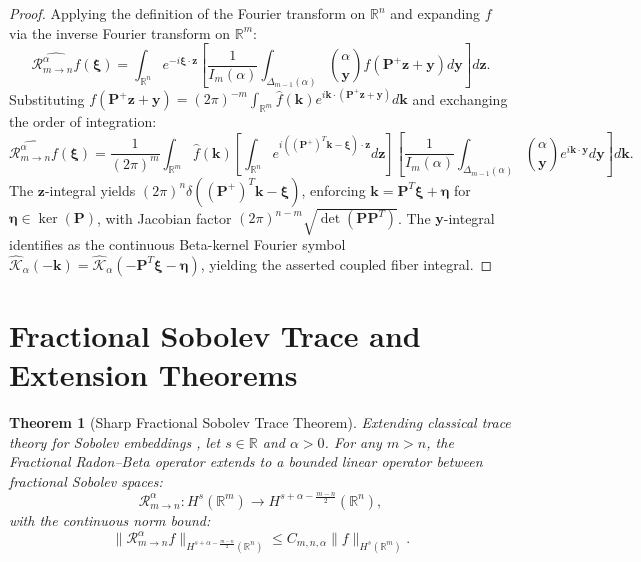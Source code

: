 \documentclass[11pt,a4paper]{article}
\theoremstyle{plain}
\newtheorem{theorem}{Theorem}[section]
\theoremstyle{definition}
\theoremstyle{remark}
\numberwithin{equation}{section}
\begin{document}
\begin{proof}
Applying the definition of the Fourier transform on $\mathbb{R}^n$ and expanding $f$ via the inverse Fourier transform on $\mathbb{R}^m$:
\begin{equation}
\widehat{\mathcal{R}_{m \to n}^\alpha f}(\boldsymbol{\xi}) = \int_{\mathbb{R}^n} e^{-i\boldsymbol{\xi}\cdot\mathbf{z}} \left[ \frac{1}{I_m(\alpha)}\int_{\Delta_{m-1}(\alpha)} \binom{\alpha}{\mathbf{y}} f(\mathbf{P}^+ \mathbf{z} + \mathbf{y}) d\mathbf{y} \right] d\mathbf{z}.
\end{equation}
Substituting $f(\mathbf{P}^+\mathbf{z} + \mathbf{y}) = (2\pi)^{-m}\int_{\mathbb{R}^m} \widehat{f}(\mathbf{k}) e^{i\mathbf{k}\cdot(\mathbf{P}^+\mathbf{z} + \mathbf{y})} d\mathbf{k}$ and exchanging the order of integration:
\begin{equation}
\widehat{\mathcal{R}_{m \to n}^\alpha f}(\boldsymbol{\xi}) = \frac{1}{(2\pi)^m}\int_{\mathbb{R}^m} \widehat{f}(\mathbf{k}) \left[\int_{\mathbb{R}^n} e^{i((\mathbf{P}^+)^T\mathbf{k} - \boldsymbol{\xi})\cdot\mathbf{z}} d\mathbf{z}\right] \left[\frac{1}{I_m(\alpha)}\int_{\Delta_{m-1}(\alpha)} \binom{\alpha}{\mathbf{y}} e^{i\mathbf{k}\cdot\mathbf{y}} d\mathbf{y}\right] d\mathbf{k}.
\end{equation}
The $\mathbf{z}$-integral yields $(2\pi)^n \delta((\mathbf{P}^+)^T\mathbf{k} - \boldsymbol{\xi})$, enforcing $\mathbf{k} = \mathbf{P}^T\boldsymbol{\xi} + \boldsymbol{\eta}$ for $\boldsymbol{\eta} \in \operatorname{ker}(\mathbf{P})$, with Jacobian factor $(2\pi)^{n-m}\sqrt{\det(\mathbf{P}\mathbf{P}^T)}$. The $\mathbf{y}$-integral identifies as the continuous Beta-kernel Fourier symbol $\widehat{\mathcal{K}}_\alpha(-\mathbf{k}) = \widehat{\mathcal{K}}_\alpha(-\mathbf{P}^T\boldsymbol{\xi} - \boldsymbol{\eta})$, yielding the asserted coupled fiber integral.
\end{proof}

\section{Fractional Sobolev Trace and Extension Theorems}

\begin{theorem}[Sharp Fractional Sobolev Trace Theorem]
\label{thm:sobolev_trace}
Extending classical trace theory for Sobolev embeddings \cite{adams2003}, let $s \in \mathbb{R}$ and $\alpha > 0$. For any $m > n$, the Fractional Radon--Beta operator extends to a bounded linear operator between fractional Sobolev spaces:
\begin{equation}
\mathcal{R}_{m \to n}^\alpha : H^s(\mathbb{R}^m) \longrightarrow H^{s + \alpha - \frac{m-n}{2}}(\mathbb{R}^n),
\end{equation}
with the continuous norm bound:
\begin{equation}
\|\mathcal{R}_{m \to n}^\alpha f\|_{H^{s + \alpha - \frac{m-n}{2}}(\mathbb{R}^n)} \le C_{m, n, \alpha} \|f\|_{H^s(\mathbb{R}^m)}.
\end{equation}
\end{theorem}
\end{document}
